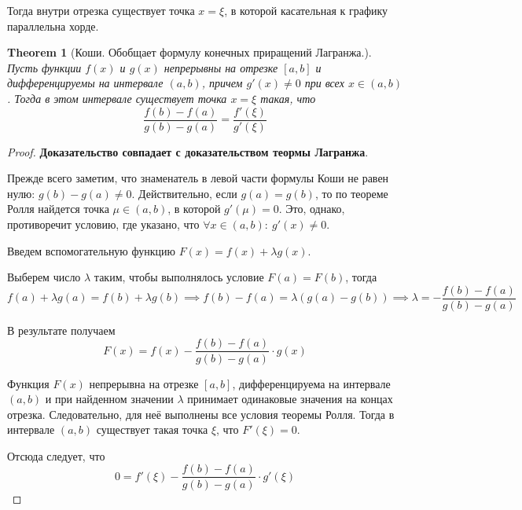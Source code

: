 \documentclass[a4paper]{article}
\theoremstyle{named}
\newtheorem*{namedtheorem}{Theorem}
\begin{document}
\begin{colloq}
		Тогда внутри отрезка существует точка $x = \xi$, в которой касательная к графику параллельна хорде.

		\begin{namedtheorem}[Коши. Обобщает формулу конечных приращений Лагранжа.]
			Пусть функции $f(x)$ и $g(x)$ непрерывны на отрезке $[a, b]$ и дифференцируемы на интервале $(a, b)$, причем $g'(x) \neq 0$ при всех $x \in (a, b)$. Тогда в этом интервале существует точка $x = \xi$ такая, что
			\begin{equation*}
				\dfrac{f(b) - f(a)}{g(b) - g(a)} = \dfrac{f'(\xi)}{g'(\xi)}
			\end{equation*}
		\end{namedtheorem}

		\begin{proof}
			\textbf{Доказательство совпадает с доказательством теормы Лагранжа}.


			Прежде всего заметим, что знаменатель в левой части формулы Коши не равен нулю: $g(b) - g(a) \neq 0$. Действительно, если $g(a) = g(b)$, то по теореме Ролля найдется точка $\mu \in (a, b)$, в которой $g'(\mu) = 0$. Это, однако, противоречит условию, где указано, что $\forall x \in (a, b): \ g'(x) \neq 0$.

			Введем вспомогательную функцию $F(x) = f(x) + \lambda g(x)$.

			Выберем число $\lambda$ таким, чтобы выполнялось условие $F(a) = F(b)$, тогда
			\begin{equation*}
				f(a) + \lambda g(a) = f(b) + \lambda g(b) 
				\implies f(b) - f(a) = \lambda(g(a) - g(b)) 
				\implies \lambda = -\dfrac{f(b) - f(a)}{g(b) - g(a)}
			\end{equation*}

			В результате получаем
			\begin{equation*}
				F(x) = f(x) - \dfrac{f(b) - f(a)}{g(b) - g(a)} \cdot g(x)
			\end{equation*}

			Функция $F(x)$ непрерывна на отрезке $[a, b]$, дифференцируема на интервале $(a, b)$ и при найденном значении $\lambda$ принимает одинаковые значения на концах отрезка. Следовательно, для неё выполнены все условия теоремы Ролля. Тогда в интервале $(a, b)$ существует такая точка $\xi$, что $F'(\xi) = 0$.

			Отсюда следует, что
			\begin{equation*}
				0 = f'(\xi) - \dfrac{f(b) - f(a)}{g(b) - g(a)} \cdot g'(\xi)
			\end{equation*}


\end{proof}
\end{colloq}
\end{document}
